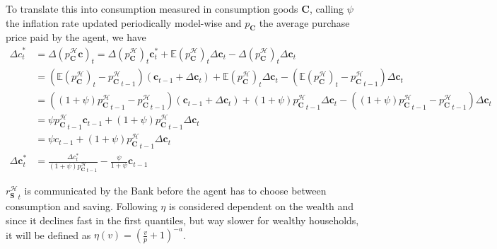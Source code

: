 \documentclass[a4paper, headings=standardclasses]{scrartcl}
\begin{document}
To translate this into consumption measured in consumption goods $\mathbf{C}$, calling $\psi$ the inflation rate updated periodically model-wise and $p_\mathbf{C}$ the average purchase price paid by the agent, we have
\begin{align*}
    {\Delta c}^*_t          & = \Delta (p^{\mathcal{H}}_\mathbf{C} \mathbf{c})_t = \Delta(p^{\mathcal{H}}_\mathbf{C})_t \mathbf{c}^*_t + \mathbb{E}(p^{\mathcal{H}}_\mathbf{C})_t {\Delta \mathbf{c}}_t - \Delta(p^{\mathcal{H}}_\mathbf{C})_t{\Delta \mathbf{c}}_t                                                                      \\
                            & = (\mathbb{E}(p^{\mathcal{H}}_\mathbf{C})_t - {p^{\mathcal{H}}_\mathbf{C}}_{t-1}) (\mathbf{c}_{t-1} + {\Delta \mathbf{c}}_t) + \mathbb{E}(p^{\mathcal{H}}_\mathbf{C})_t {\Delta \mathbf{c}}_t - (\mathbb{E}(p^{\mathcal{H}}_\mathbf{C})_t - {p^{\mathcal{H}}_\mathbf{C}}_{t-1}){\Delta \mathbf{c}}_t       \\
                            & = ((1+\psi){p^{\mathcal{H}}_\mathbf{C}}_{t-1} - {p^{\mathcal{H}}_\mathbf{C}}_{t-1}) (\mathbf{c}_{t-1} + {\Delta \mathbf{c}}_t) + (1+\psi){p^{\mathcal{H}}_\mathbf{C}}_{t-1} {\Delta \mathbf{c}}_t - ((1+\psi){p^{\mathcal{H}}_\mathbf{C}}_{t-1} - {p^{\mathcal{H}}_\mathbf{C}}_{t-1}){\Delta \mathbf{c}}_t \\
                            & = \psi {p^{\mathcal{H}}_\mathbf{C}}_{t-1} \mathbf{c}_{t-1} + (1+\psi){p^{\mathcal{H}}_\mathbf{C}}_{t-1} {\Delta \mathbf{c}}_t                                                                                                                                                                              \\
                            & = \psi c_{t-1} + (1+\psi){p^{\mathcal{H}}_\mathbf{C}}_{t-1} {\Delta \mathbf{c}}_t                                                                                                                                                                                                                          \\
    {\Delta \mathbf{c}}^*_t & = \frac{\Delta c^*_t}{(1+\psi){p^{\mathcal{H}}_\mathbf{C}}_{t-1}} - \frac{\psi}{1+\psi}{\mathbf{c}_{t-1}}
\end{align*}

${r^{\mathcal{H}}_\mathbf{S}}_t$ is communicated by the Bank before the agent has to choose between consumption and saving. Following \textcite{fisher2020} $\eta$ is considered dependent on the wealth and since it declines fast in the first quantiles, but way slower for wealthy households, it will be defined as $\eta(v) = (\frac{v}{p} + 1)^{-a}$.
\end{document}
